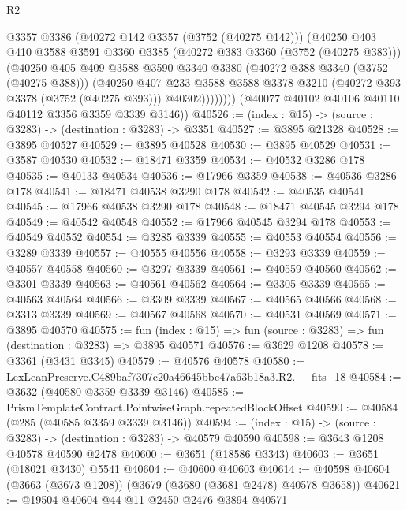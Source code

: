 \begin{lexlean}{R2}
\begin{coremodule}
                @3357
                @3386
                (@40272 @142 @3357 (@3752 (@40275 @142)))
                (@40250
                  @403
                  @410
                  @3588
                  @3591
                  @3360
                  @3385
                  (@40272 @383 @3360 (@3752 (@40275 @383)))
                  (@40250
                    @405
                    @409
                    @3588
                    @3590
                    @3340
                    @3380
                    (@40272 @388 @3340 (@3752 (@40275 @388)))
                    (@40250
                      @407
                      @233
                      @3588
                      @3588
                      @3378
                      @3210
                      (@40272 @393 @3378 (@3752 (@40275 @393)))
                      @40302))))))))
      (@40077 @40102 @40106 @40110 @40112 @3356 @3359 @3339 @3146))
@40526 := (index : @15) -> (source : @3283) -> (destination : @3283) -> @3351
@40527 := @3895 @21328
@40528 := @3895 @40527
@40529 := @3895 @40528
@40530 := @3895 @40529
@40531 := @3587 @40530
@40532 := @18471 @3359
@40534 := @40532 @3286 @178
@40535 := @40133 @40534
@40536 := @17966 @3359
@40538 := @40536 @3286 @178
@40541 := @18471 @40538 @3290 @178
@40542 := @40535 @40541
@40545 := @17966 @40538 @3290 @178
@40548 := @18471 @40545 @3294 @178
@40549 := @40542 @40548
@40552 := @17966 @40545 @3294 @178
@40553 := @40549 @40552
@40554 := @3285 @3339
@40555 := @40553 @40554
@40556 := @3289 @3339
@40557 := @40555 @40556
@40558 := @3293 @3339
@40559 := @40557 @40558
@40560 := @3297 @3339
@40561 := @40559 @40560
@40562 := @3301 @3339
@40563 := @40561 @40562
@40564 := @3305 @3339
@40565 := @40563 @40564
@40566 := @3309 @3339
@40567 := @40565 @40566
@40568 := @3313 @3339
@40569 := @40567 @40568
@40570 := @40531 @40569
@40571 := @3895 @40570
@40575 := fun (index : @15) => fun (source : @3283) => fun (destination : @3283) => @3895 @40571
@40576 := @3629 @1208
@40578 := @3361 (@3431 @3345)
@40579 := @40576 @40578
@40580 := LexLeanPreserve.C489baf7307c20a46645bbc47a63b18a3.R2.__fits_18
@40584 := @3632 (@40580 @3359 @3339 @3146)
@40585 := PrismTemplateContract.PointwiseGraph.repeatedBlockOffset
@40590 := @40584 (@285 (@40585 @3359 @3339 @3146))
@40594 := (index : @15) -> (source : @3283) -> (destination : @3283) -> @40579 @40590
@40598 := @3643 @1208 @40578 @40590 @2478
@40600 := @3651 (@18586 @3343)
@40603 := @3651 (@18021 @3430) @5541
@40604 := @40600 @40603
@40614 := @40598 @40604 (@3663 (@3673 @1208)) (@3679 (@3680 (@3681 @2478) @40578 @3658))
@40621 := @19504 @40604 @44 @11 @2450 @2476 @3894 @40571

\end{coremodule}
\end{lexlean}
